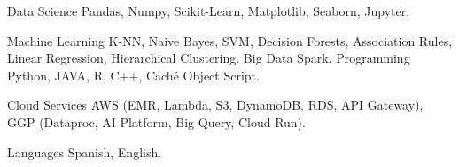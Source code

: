 

\begin{cvskills}

  \cvskill
    {Data Science} %
    {Pandas, Numpy, Scikit-Learn, Matplotlib, Seaborn, Jupyter.} %

  \cvskill
    {Machine Learning} %
    {K-NN, Naive Bayes, SVM, Decision Forests, Association Rules, Linear Regression, Hierarchical Clustering.} %
  \cvskill
    {Big Data} %
    {Spark.} %
  \cvskill
    {Programming} %
    {Python, JAVA, R, C++, Caché Object Script.} %

  \cvskill
    {Cloud Services} %
    {AWS (EMR, Lambda, S3, DynamoDB, RDS, API Gateway), GGP (Dataproc, AI Platform, Big Query, Cloud Run).} %

  \cvskill
    {Languages} %
    {Spanish, English.} %
\end{cvskills}
